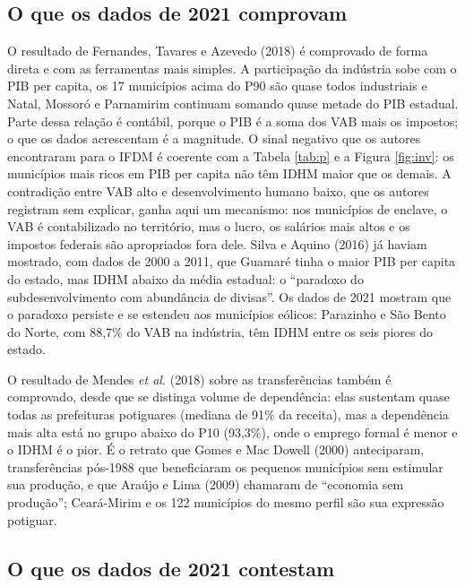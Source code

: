 \documentclass[12pt,a4paper]{article}
\begin{document}
\subsection{O que os dados de 2021 comprovam}

O resultado de Fernandes, Tavares e Azevedo (2018) é comprovado de forma direta e com as ferramentas mais simples. A participação da indústria sobe com o PIB per capita, os 17 municípios acima do P90 são quase todos industriais e Natal, Mossoró e Parnamirim continuam somando quase metade do PIB estadual. Parte dessa relação é contábil, porque o PIB é a soma dos VAB mais os impostos; o que os dados acrescentam é a magnitude. O sinal negativo que os autores encontraram para o IFDM é coerente com a Tabela \ref{tab:p} e a Figura \ref{fig:inv}: os municípios mais ricos em PIB per capita não têm IDHM maior que os demais. A contradição entre VAB alto e desenvolvimento humano baixo, que os autores registram sem explicar, ganha aqui um mecanismo: nos municípios de enclave, o VAB é contabilizado no território, mas o lucro, os salários mais altos e os impostos federais são apropriados fora dele. Silva e Aquino (2016) já haviam mostrado, com dados de 2000 a 2011, que Guamaré tinha o maior PIB per capita do estado, mas IDHM abaixo da média estadual: o ``paradoxo do subdesenvolvimento com abundância de divisas''. Os dados de 2021 mostram que o paradoxo persiste e se estendeu aos municípios eólicos: Parazinho e São Bento do Norte, com 88,7\% do VAB na indústria, têm IDHM entre os seis piores do estado.

O resultado de Mendes \textit{et al.} (2018) sobre as transferências também é comprovado, desde que se distinga volume de dependência: elas sustentam quase todas as prefeituras potiguares (mediana de 91\% da receita), mas a dependência mais alta está no grupo abaixo do P10 (93,3\%), onde o emprego formal é menor e o IDHM é o pior. É o retrato que Gomes e Mac Dowell (2000) anteciparam, transferências pós-1988 que beneficiaram os pequenos municípios sem estimular sua produção, e que Araújo e Lima (2009) chamaram de ``economia sem produção''; Ceará-Mirim e os 122 municípios do mesmo perfil são sua expressão potiguar.

\subsection{O que os dados de 2021 contestam}
\end{document}
